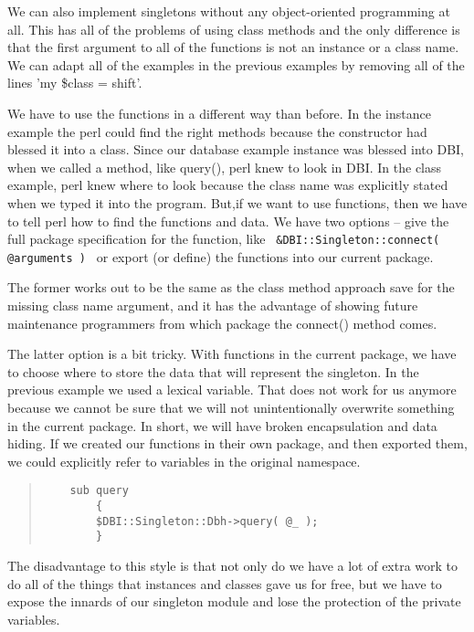 We can also implement singletons without any object-oriented
programming at all.  This has all of the
problems of using class methods and the only difference is
that the first argument to all of the functions is not an
instance or a class name.  We can adapt all of the examples
in the previous examples by removing all of the lines 'my
\$class = shift'.

We have to use the functions in a different way than before.
 In the instance example the perl could find the right
methods because the constructor had blessed it into a class.
 Since our database example instance was blessed into DBI,
when we called a method, like query(), perl knew to look in
DBI.  In the class example, perl knew where to
look because the class name was explicitly stated when we
typed it into the program.  But,if we want to use functions,
then we have to tell perl how to find the functions and
data.  We have two options -- give the full package
specification for the function, like {\tt
\&DBI::Singleton::connect( @arguments ) } or export (or
define) the functions into our current package.

The former works out to be the same as the class method
approach save for the missing class name argument, and it
has the advantage of showing future maintenance programmers
from which package the connect() method comes.

The latter option is a bit tricky.  With functions in the
current package, we have to choose where to store the data
that will represent the singleton. In the previous example
we used a lexical variable.  That does not work for us
anymore because we cannot be sure that we will not
unintentionally overwrite something in the current package. 
In short, we will have broken encapsulation and data hiding.
 If we created our functions in their own package, and then
exported them, we could explicitly refer to variables in the
original namespace.

\begin{quote}    
\begin{verbatim}
    sub query
        {
        $DBI::Singleton::Dbh->query( @_ );
        }
\end{verbatim}
\end{quote}

The disadvantage to this style is that not only do we have a
lot of extra work to do all of the things that instances and
classes gave us for free, but we have to expose the innards
of our singleton module and lose the protection of the
private variables.

